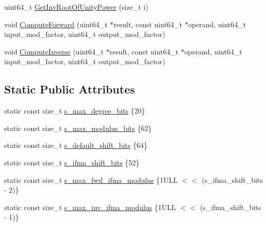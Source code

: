 \begin{DoxyCompactItemize}
\item 
uint64\-\_\-t \hyperlink{classhetest_1_1utils_1_1NTT_1_1NTTImpl_ae321a809bd4a9121b4d0a9a3c8f22851}{Get\-Inv\-Root\-Of\-Unity\-Power} (size\-\_\-t i)
\item 
void \hyperlink{classhetest_1_1utils_1_1NTT_1_1NTTImpl_a23e8a1b8cd8f2a3700b9daa7d729dcfc}{Compute\-Forward} (uint64\-\_\-t $\ast$result, const uint64\-\_\-t $\ast$operand, uint64\-\_\-t input\-\_\-mod\-\_\-factor, uint64\-\_\-t output\-\_\-mod\-\_\-factor)
\item 
void \hyperlink{classhetest_1_1utils_1_1NTT_1_1NTTImpl_aa9ddcd3bcd21f49f7c299959aae6baeb}{Compute\-Inverse} (uint64\-\_\-t $\ast$result, const uint64\-\_\-t $\ast$operand, uint64\-\_\-t input\-\_\-mod\-\_\-factor, uint64\-\_\-t output\-\_\-mod\-\_\-factor)
\end{DoxyCompactItemize}
\subsection*{Static Public Attributes}
\begin{DoxyCompactItemize}
\item 
static const size\-\_\-t \hyperlink{classhetest_1_1utils_1_1NTT_1_1NTTImpl_a44a2ac7f296bce27f708fb2e66ee1e5a}{s\-\_\-max\-\_\-degree\-\_\-bits} \{20\}
\item 
static const size\-\_\-t \hyperlink{classhetest_1_1utils_1_1NTT_1_1NTTImpl_ad457af43716b631a2471415bc604a530}{s\-\_\-max\-\_\-modulus\-\_\-bits} \{62\}
\item 
static const size\-\_\-t \hyperlink{classhetest_1_1utils_1_1NTT_1_1NTTImpl_a326fa5e71930b879eb060bc39ddd8d76}{s\-\_\-default\-\_\-shift\-\_\-bits} \{64\}
\item 
static const size\-\_\-t \hyperlink{classhetest_1_1utils_1_1NTT_1_1NTTImpl_a62363392951d4f7e9f380c4d427bef4b}{s\-\_\-ifma\-\_\-shift\-\_\-bits} \{52\}
\item 
static const size\-\_\-t \hyperlink{classhetest_1_1utils_1_1NTT_1_1NTTImpl_a7298cbc8ef00280200ac1bb1f416ca9a}{s\-\_\-max\-\_\-fwd\-\_\-ifma\-\_\-modulus} \{1\-U\-L\-L $<$$<$ (s\-\_\-ifma\-\_\-shift\-\_\-bits -\/ 2)\}
\item 
static const size\-\_\-t \hyperlink{classhetest_1_1utils_1_1NTT_1_1NTTImpl_adb491e973c3b2e087cc7ad5759fb6de4}{s\-\_\-max\-\_\-inv\-\_\-ifma\-\_\-modulus} \{1\-U\-L\-L $<$$<$ (s\-\_\-ifma\-\_\-shift\-\_\-bits -\/ 1)\}
\end{DoxyCompactItemize}


